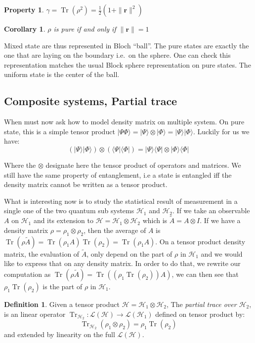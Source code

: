\documentclass[10pt]{report}
\theoremstyle{plain}
\newtheorem{prop}[thm]{Property}
\newtheorem{cor}{Corollary}[thm]
\theoremstyle{definition}
\newtheorem{defn}{Definition}[chapter]
\theoremstyle{remark}
\newcommand{\ket}[1]{|#1\rangle}
\newcommand{\bra}[1]{\langle#1|}
\newcommand{\bs}{\boldsymbol}
\DeclareMathOperator{\Tr}{Tr}
\begin{document}
\begin{prop}
  $\gamma = \Tr(\rho^2) = \frac 12 (1 + \|\bs r\|^2)$
\end{prop}

\begin{cor}
  $\rho$ is pure if and only if $\|\bs r\| = 1$
\end{cor}

Mixed state are thus represented in Bloch ``ball''. The pure states are exactly
the one that are laying on the boundary i.e.\ on the sphere. One can check this
representation matches the usual Block sphere representation on pure states. The
uniform state is the center of the ball.

\subsection{Composite systems, Partial trace}

When must now ask how to model density matrix on multiple system. On pure state,
this is a simple tensor product $\ket{\Psi\Phi} = \ket \Psi \otimes \ket \Phi =
\ket \Psi\ket\Phi$. Luckily for us we have:
\[(\ket\Psi\ket\Phi) \otimes (\bra\Psi\bra\Phi) = \ket\Psi\bra\Psi \otimes \ket
  \Phi \bra \Phi\]

Where the $\otimes$ designate here the tensor product of operators and matrices.
We still have the same property of entanglement, i.e a state is entangled iff
the density matrix cannot be written as a tensor product.

What is interesting now is to study the statistical result of measurement in a
single one of the two quantum sub systems $\mathcal{H}_1$ and $\mathcal{H}_2$.
If we take an observable $A$ on $\mathcal{H}_1$ and its extension to
$\mathcal{H} = \mathcal{H}_1 \otimes \mathcal{H}_2$ which is $\tilde A = A
\otimes I$. If we have a density matrix $\rho = \rho_1 \otimes \rho_2$, then the
average of $A$ is $\Tr(\rho \tilde A) = \Tr(\rho_1A)\Tr(\rho_2) = \Tr(\rho_1A)$.
On a tensor product density matrix, the evaluation of $\tilde A$, only depend on
the part of $\rho$ in $\mathcal{H}_1$ and we would like to express that on any
density matrix. In order to do that, we rewrite our computation as
$\Tr(\rho\tilde A) = \Tr((\rho_1\Tr(\rho_2))A)$, we can then see that
$\rho_1\Tr(\rho_2)$ is the part of $\rho$ in $\mathcal{H}_1$.

\begin{defn}
  Given a tensor product $\mathcal{H} = \mathcal{H}_1 \otimes \mathcal{H}_2$,
  The \emph{partial trace over $\mathcal{H}_2$}, is an linear operator
  $\Tr_{\mathcal{H}_2} : \mathcal{L}(\mathcal{H}) \to
  \mathcal{L}(\mathcal{H}_1)$ defined on tensor product by:
  \[\Tr_{\mathcal{H}_2}(\rho_1\otimes \rho_2) = \rho_1 \Tr(\rho_2)\]
  and extended by linearity on the full $\mathcal{L}(\mathcal{H})$.
\end{defn}
\end{document}
